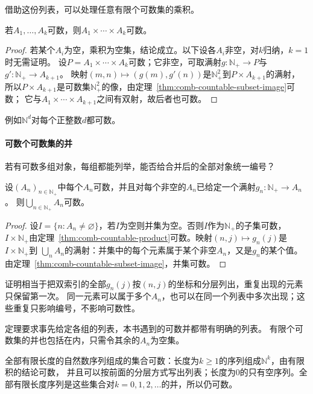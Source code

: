 借助这份列表，可以处理任意有限个可数集的乘积。
\begin{theorem}[有限笛卡尔积的可数性]
\label{thm:comb-countable-product}
若$A_1,\ldots,A_k$可数，则$A_1\times\cdots\times A_k$可数。
\end{theorem}
\begin{proof}
若某个$A_i$为空，乘积为空集，结论成立。以下设各$A_i$非空，对$k$归纳，$k=1$时无需证明。
设$P=A_1\times\cdots\times A_k$可数；它非空，可取满射$g:\mathbb N_+\to P$与$g':\mathbb N_+\to A_{k+1}$。
映射$(m,n)\mapsto(g(m),g'(n))$是$\mathbb N_+^2$到$P\times A_{k+1}$的满射，
所以$P\times A_{k+1}$是可数集$\mathbb N_+^2$的像，由定理~\ref{thm:comb-countable-subset-image}可数；
它与$A_1\times\cdots\times A_{k+1}$之间有双射，故后者也可数。
\end{proof}
例如$\mathbb N^d$对每个正整数$d$都可数。

\paragraph{可数个可数集的并}
若有可数多组对象，每组都能列举，能否给合并后的全部对象统一编号？
\begin{theorem}[可数并的可数性]
\label{thm:comb-countable-union}
设$(A_n)_{n\in\mathbb N_+}$中每个$A_n$可数，并且对每个非空的$A_n$已给定一个满射$g_n:\mathbb N_+\to A_n$。
则$\bigcup_{n\in\mathbb N_+}A_n$可数。
\end{theorem}
\begin{proof}
设$I=\{n:A_n\neq\varnothing\}$，若$I$为空则并集为空。否则$I$作为$\mathbb N_+$的子集可数，
$I\times\mathbb N_+$由定理~\ref{thm:comb-countable-product}可数。映射$(n,j)\mapsto g_n(j)$是$I\times\mathbb N_+$到
$\bigcup_nA_n$的满射：并集中的每个元素属于某个非空$A_n$，又是$g_n$的某个值。由定理~\ref{thm:comb-countable-subset-image}，并集可数。
\end{proof}
证明相当于把双索引的全部$g_n(j)$按$(n,j)$的坐标和分层列出，重复出现的元素只保留第一次。
同一元素可以属于多个$A_n$，也可以在同一个列表中多次出现；这些重复只影响编号，不影响可数性。

定理要求事先给定各组的列表，本书遇到的可数并都带有明确的列表。
有限个可数集的并也包括在内，只需令其余的$A_n$为空集。
\begin{example}[有限长度序列的全体]
\label{ex:card-finite-sequences}
全部有限长度的自然数序列组成的集合可数：长度为$k\geq1$的序列组成$\mathbb N^k$，由有限积的结论可数，
并且可以按前面的分层方式写出列表；长度为$0$的只有空序列。全部有限长度序列是这些集合对$k=0,1,2,\ldots$的并，所以仍可数。
\end{example}

